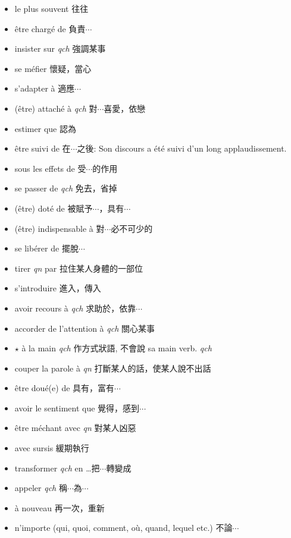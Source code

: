 \documentclass{book}
\begin{document}
\begin{itemize}
            \item le plus souvent 往往
            \item être chargé de 負責$\cdots$
            \item insister sur \textit{qch} 強調某事
            \item se méfier 懷疑，當心
            \item s'adapter à 適應$\cdots$
            \item (être) attaché à \textit{qch} 對$\cdots$喜愛，依戀
            \item estimer que 認為
            \item être suivi de 在$\cdots$之後: Son discours a été suivi d'un long applaudissement.
            \item sous les effets de 受$\cdots$的作用
            \item se passer de \textit{qch} 免去，省掉
            \item (être) doté de 被賦予$\cdots$，具有$\cdots$
            \item (être) indispensable à 對$\cdots$必不可少的
            \item se libérer de 擺脫$\cdots$
            \item tirer \textit{qn} par 拉住某人身體的一部位
            \item s'introduire 進入，傳入
            \item avoir recours à \textit{qch} 求助於，依靠$\cdots$
            \item accorder de l'attention à \textit{qch} 關心某事
            \item $\star$ à la main \textit{qch} 作方式狀語, 不會說 sa main verb. \textit{qch}
            \item couper la parole à \textit{qn} 打斷某人的話，使某人說不出話
            \item être doué(e) de 具有，富有$\cdots$
            \item avoir le sentiment que 覺得，感到$\cdots$
            \item être méchant avec \textit{qn} 對某人凶惡
            \item avec sursis 緩期執行
            \item transformer \textit{qch} en \dots 把$\cdots$轉變成
            \item appeler \textit{qch} 稱$\cdots$為$\cdots$
            \item à nouveau 再一次，重新
            \item n'importe (qui, quoi, comment, où, quand, lequel etc.) 不論$\cdots$

\end{itemize}
\end{document}
